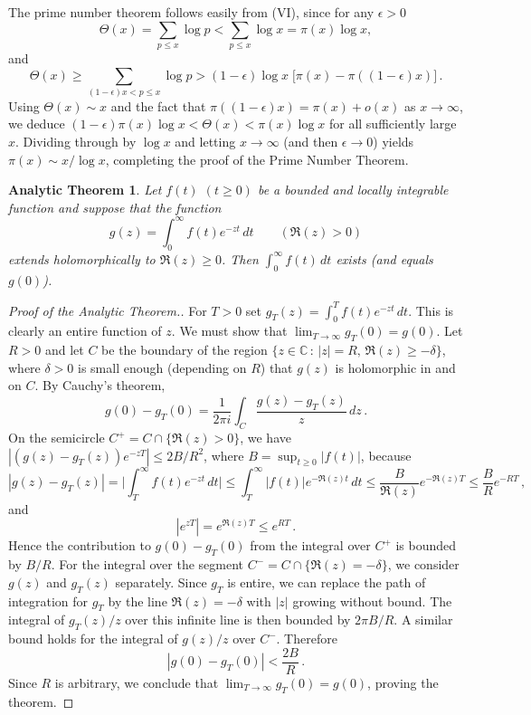 \documentclass{article}
\newtheorem*{analyticthm}{Analytic Theorem}
\begin{document}
The prime number theorem follows easily from (VI), since for any $\epsilon>0$
\[
\Theta(x) = \sum_{p\le x}\log p < \sum_{p\le x}\log x = \pi(x)\log x,
\] 
and 
\[
\Theta(x) \ge \sum_{(1-\epsilon)x < p \le x}\log p > (1-\epsilon)\log x\;\big[\pi(x) - \pi((1-\epsilon)x)\big]\,.
\] 
Using $\Theta(x)\sim x$ and the fact that $\pi((1-\epsilon)x) = \pi(x) + o(x)$ as $x\to\infty$, we deduce $(1-\epsilon)\pi(x)\log x < \Theta(x) < \pi(x)\log x$ for all sufficiently large $x$. Dividing through by $\log x$ and letting $x\to\infty$ (and then $\epsilon\to 0$) yields $\pi(x)\sim x/\log x$, completing the proof of the Prime Number Theorem.

\begin{analyticthm}
Let $f(t)$ $(t\ge 0)$ be a bounded and locally integrable function and suppose that the function 
\[ 
g(z) = \int_{0}^{\infty} f(t)e^{-zt}\,dt \qquad (\Re(z)>0)
\] 
extends holomorphically to $\Re(z)\ge 0$. Then $\int_{0}^{\infty} f(t)\,dt$ exists (and equals $g(0)$).
\end{analyticthm}
\begin{proof}[Proof of the Analytic Theorem.]
For $T>0$ set $g_T(z) = \int_{0}^{T}f(t)e^{-zt}\,dt$. This is clearly an entire function of $z$. We must show that $\lim_{T\to\infty}g_T(0) = g(0)$. Let $R>0$ and let $C$ be the boundary of the region $\{z\in\mathbb{C}\,:\,|z|=R,\,\Re(z)\ge -\delta\}$, where $\delta>0$ is small enough (depending on $R$) that $g(z)$ is holomorphic in and on $C$. By Cauchy's theorem,
\[
g(0)-g_T(0) = \frac{1}{2\pi i}\int_{C} \frac{g(z)-g_T(z)}{z}\,dz\,.
\] 
On the semicircle $C^+ = C\cap\{\Re(z)>0\}$, we have $|(g(z)-g_T(z))e^{-zT}|\le 2B/R^2$, where $B = \sup_{t\ge 0}|f(t)|$, because 
\[
|g(z)-g_T(z)| = \Big|\int_{T}^{\infty}f(t)e^{-zt}\,dt\Big| \le \int_{T}^{\infty}|f(t)|e^{-\Re(z)t}\,dt \le \frac{B}{\Re(z)}e^{-\Re(z)T} \le \frac{B}{R}e^{-RT}\,,
\] 
and 
\[
|e^{zT}| = e^{\Re(z)T} \le e^{RT}\,. 
\] 
Hence the contribution to $g(0)-g_T(0)$ from the integral over $C^+$ is bounded by $B/R$. For the integral over the segment $C^- = C\cap\{\Re(z)=-\delta\}$, we consider $g(z)$ and $g_T(z)$ separately. Since $g_T$ is entire, we can replace the path of integration for $g_T$ by the line $\Re(z)=-\delta$ with $|z|$ growing without bound. The integral of $g_T(z)/z$ over this infinite line is then bounded by $2\pi B/R$. A similar bound holds for the integral of $g(z)/z$ over $C^-$. Therefore 
\[
|g(0)-g_T(0)| < \frac{2B}{R}\,. 
\] 
Since $R$ is arbitrary, we conclude that $\lim_{T\to\infty}g_T(0) = g(0)$, proving the theorem.
\end{proof}
\end{document}
